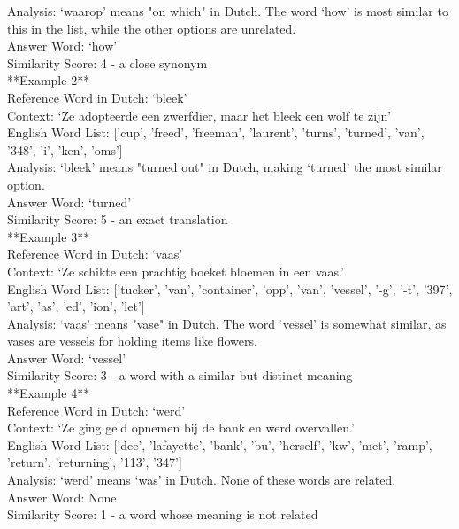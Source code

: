 \begin{displayquote}
Analysis: ‘waarop’ means "on which" in Dutch. The word ‘how’ is most similar to this in the list, while the other options are unrelated. \\ 
Answer Word: ‘how’ \\ 
Similarity Score: 4 - a close synonym \\ 

**Example 2** \\ 
Reference Word in Dutch: ‘bleek’ \\ 
Context: ‘Ze adopteerde een zwerfdier, maar het bleek een wolf te zijn’ \\ 
English Word List: ['cup', 'freed', 'freeman', 'laurent', 'turns', 'turned', 'van', '348', 'i', 'ken', 'oms'] \\ 

Analysis: ‘bleek’ means "turned out" in Dutch, making ‘turned’ the most similar option. \\ 
Answer Word: ‘turned’ \\ 
Similarity Score: 5 - an exact translation \\ 

**Example 3** \\ 
Reference Word in Dutch: ‘vaas’ \\ 
Context: ‘Ze schikte een prachtig boeket bloemen in een vaas.’ \\ 
English Word List: ['tucker', 'van', 'container', 'opp', 'van', 'vessel', '-g', '-t', '397', 'art', 'as', 'ed', 'ion', 'let'] \\ 

Analysis: ‘vaas’ means "vase" in Dutch. The word ‘vessel’ is somewhat similar, as vases are vessels for holding items like flowers. \\ 
Answer Word: ‘vessel’ \\ 
Similarity Score: 3 - a word with a similar but distinct meaning \\ 

**Example 4** \\ 
Reference Word in Dutch: ‘werd’ \\ 
Context: ‘Ze ging geld opnemen bij de bank en werd overvallen.’ \\ 
English Word List: ['dee', 'lafayette', 'bank', 'bu', 'herself', 'kw', 'met', 'ramp', 'return', 'returning', '113', '347'] \\ 

Analysis: ‘werd’ means `was' in Dutch. None of these words are related. \\ 
Answer Word: None \\ 
Similarity Score: 1 - a word whose meaning is not related \\ 


\end{displayquote}
